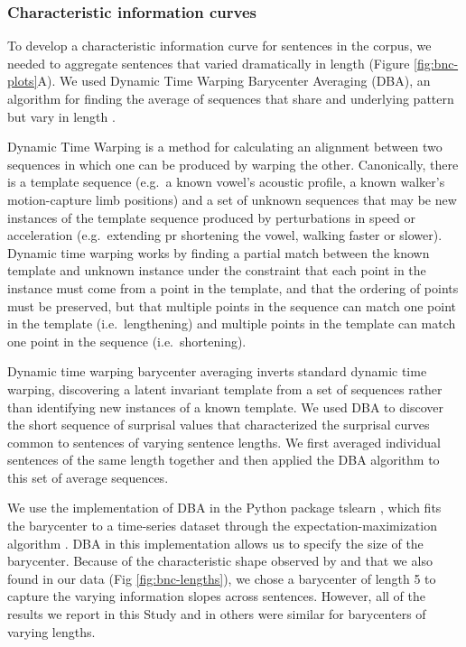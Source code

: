 \documentclass[entropy,article,submit,moreauthors,pdftex]{mdpi}
\begin{document}
\hypertarget{characteristic-information-curves}{%
\subsubsection{Characteristic information
curves}\label{characteristic-information-curves}}

To develop a characteristic information curve for sentences in the
corpus, we needed to aggregate sentences that varied dramatically in
length (Figure \ref{fig:bnc-plots}A). We used Dynamic Time Warping
Barycenter Averaging (DBA), an algorithm for finding the average of
sequences that share and underlying pattern but vary in length
\citep{petitjean2011}.

Dynamic Time Warping is a method for calculating an alignment between
two sequences in which one can be produced by warping the other.
Canonically, there is a template sequence (e.g.~a known vowel's acoustic
profile, a known walker's motion-capture limb positions) and a set of
unknown sequences that may be new instances of the template sequence
produced by perturbations in speed or acceleration (e.g.~extending pr
shortening the vowel, walking faster or slower). Dynamic time warping
works by finding a partial match between the known template and unknown
instance under the constraint that each point in the instance must come
from a point in the template, and that the ordering of points must be
preserved, but that multiple points in the sequence can match one point
in the template (i.e.~lengthening) and multiple points in the template
can match one point in the sequence (i.e.~shortening).

Dynamic time warping barycenter averaging inverts standard dynamic time
warping, discovering a latent invariant template from a set of sequences
rather than identifying new instances of a known template. We used DBA
to discover the short sequence of surprisal values that characterized
the surprisal curves common to sentences of varying sentence lengths. We
first averaged individual sentences of the same length together and then
applied the DBA algorithm to this set of average sequences.

We use the implementation of DBA in the Python package tslearn
\citep{tavenard2017}, which fits the barycenter to a time-series dataset
through the expectation-maximization algorithm \citep[EM][]{moon1996}.
DBA in this implementation allows us to specify the size of the
barycenter. Because of the characteristic shape observed by
\citet{yu2016} and that we also found in our data (Fig
\ref{fig:bnc-lengths}), we chose a barycenter of length 5 to capture the
varying information slopes across sentences. However, all of the results
we report in this Study and in others were similar for barycenters of
varying lengths.
\end{document}

